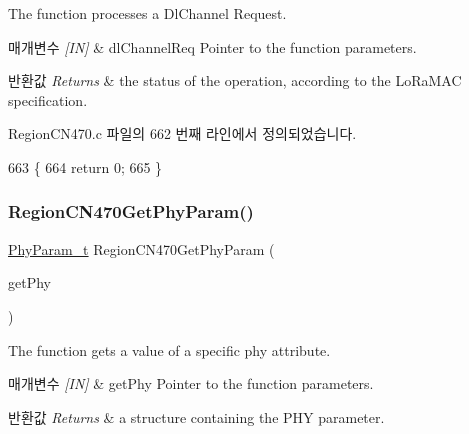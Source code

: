 The function processes a Dl\+Channel Request. 


\begin{DoxyParams}{매개변수}
{\em \mbox{[}\+I\+N\mbox{]}} & dl\+Channel\+Req Pointer to the function parameters.\\
\hline
\end{DoxyParams}

\begin{DoxyRetVals}{반환값}
{\em Returns} & the status of the operation, according to the Lo\+Ra\+M\+AC specification. \\
\hline
\end{DoxyRetVals}


Region\+C\+N470.\+c 파일의 662 번째 라인에서 정의되었습니다.


\begin{DoxyCode}
663 \{
664     \textcolor{keywordflow}{return} 0;
665 \}
\end{DoxyCode}
\mbox{\label{group___r_e_g_i_o_n_c_n470_gaa3f4e59184226b161b9e6880b6e7f204}} 
\subsubsection{\texorpdfstring{Region\+C\+N470\+Get\+Phy\+Param()}{RegionCN470GetPhyParam()}}
{\footnotesize\ttfamily \mbox{\hyperlink{group___r_e_g_i_o_n_gaed159b26e5c4677236b6e8677019db30}{Phy\+Param\+\_\+t}} Region\+C\+N470\+Get\+Phy\+Param (\begin{DoxyParamCaption}\item[{\mbox{\hyperlink{group___r_e_g_i_o_n_gab471483fff904f4f89bbc03f7fc380ab}{Get\+Phy\+Params\+\_\+t}} $\ast$}]{get\+Phy }\end{DoxyParamCaption})}



The function gets a value of a specific phy attribute. 


\begin{DoxyParams}{매개변수}
{\em \mbox{[}\+I\+N\mbox{]}} & get\+Phy Pointer to the function parameters.\\
\hline
\end{DoxyParams}

\begin{DoxyRetVals}{반환값}
{\em Returns} & a structure containing the P\+HY parameter. \\
\hline
\end{DoxyRetVals}



